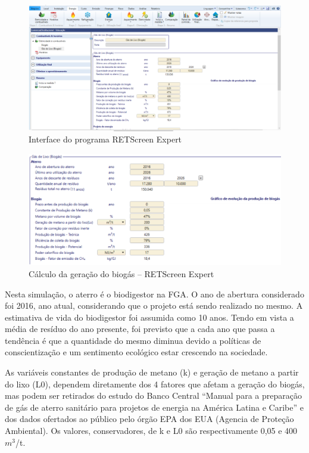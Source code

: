 \begin{figure}[!htb]
\centering
\includegraphics[width=0.75\paperwidth]{figuras/ret1.png}
\caption{Interface do programa RETScreen Expert}
\label{fig:ret1}
\end{figure}

\begin{figure}[!htb]
\centering
\includegraphics[width=0.75\paperwidth]{figuras/ret2.png}
\caption{Cálculo da geração do biogás – RETScreen Expert}
\label{fig:ret2}
\end{figure}

Nesta simulação, o aterro é o biodigestor na FGA. O ano de abertura considerado foi 2016, ano atual, considerando que o projeto está sendo realizado no mesmo. A estimativa de vida do biodigestor foi assumida como 10 anos. Tendo em vista a média de resíduo do ano presente, foi previsto que a cada ano que passa a tendência é que a quantidade do mesmo diminua devido a políticas de conscientização e um sentimento ecológico estar crescendo na sociedade.

As variáveis constantes de produção de metano (k) e geração de metano a partir do lixo (L0), dependem diretamente dos 4 fatores que afetam a geração do biogás, mas podem ser retirados do estudo do Banco Central “Manual para a preparação de gás de aterro sanitário para projetos de energia na América Latina e Caribe” e dos dados ofertados ao público pelo órgão EPA dos EUA (Agencia de Proteção Ambiental). Os valores, conservadores, de k e L0 são respectivamente 0,05 e 400 $m^{3}$/t.

